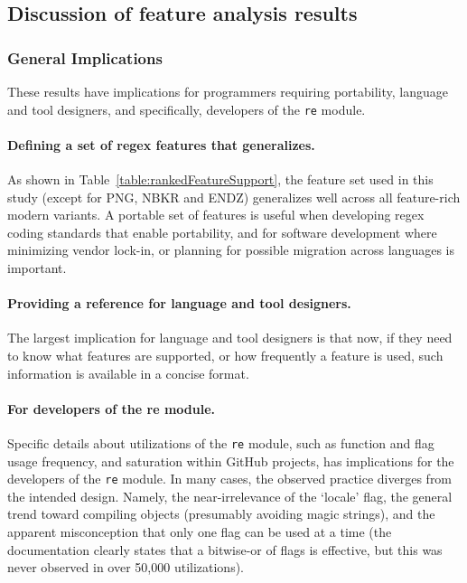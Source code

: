 \subsection{Discussion of feature analysis results}
\label{sec:featureDiscussion}

\subsubsection{General Implications}
These results have implications for programmers requiring portability, language and tool designers, and specifically, developers of the {\tt re} module.

\paragraph{Defining a set of regex features that generalizes.} As shown in Table~\ref{table:rankedFeatureSupport}, the feature set used in this study (except for PNG, NBKR and ENDZ) generalizes well across all feature-rich modern variants.  A portable set of features is useful when developing regex coding standards that enable portability, and for software development where minimizing vendor lock-in, or planning for possible migration across languages is important.

\paragraph{Providing a reference for language and tool designers.} The largest implication for language and tool designers is that now, if they need to know what features are supported, or how frequently a feature is used, such information is available in a concise format.

\paragraph{For developers of the re module.} Specific details about utilizations of the {\tt re} module, such as function and flag usage frequency, and saturation within GitHub projects, has implications for the developers of the {\tt re} module.  In many cases, the observed practice diverges from the intended design.  Namely, the near-irrelevance of the `locale' flag, the general trend toward compiling objects (presumably avoiding magic strings), and the apparent misconception that only one flag can be used at a time (the documentation clearly states that a bitwise-or of flags is effective, but this was never observed in over 50,000 utilizations).

